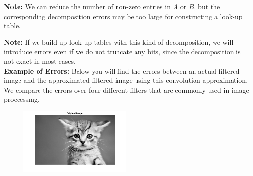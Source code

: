 \documentclass[12pt]{amsart}
\theoremstyle{definition}
\theoremstyle{remark}
\numberwithin{thm}{section}
\begin{document}
\textbf{Note:} We can reduce the number of non-zero entries in $A$ or $B$, but the corresponding decomposition errors may be too large for constructing a look-up table. 

\textbf{Note:} If we build up look-up tables with this kind of decomposition, we will introduce errors even if we do not truncate any bits, since the decomposition is not exact in most cases.
\\

\textbf{Example of Errors:} Below you will find the errors between an actual filtered image and the approximated filtered image using this convolution approximation. We compare the errors over four different filters that are commonly used in image proccessing. 
\begin{figure}[htb]
  \begin{center}
  \mbox{\includegraphics[height=1.3in]{kitten.png}}
 
   
\end{center}
\end{figure}
\end{document}
